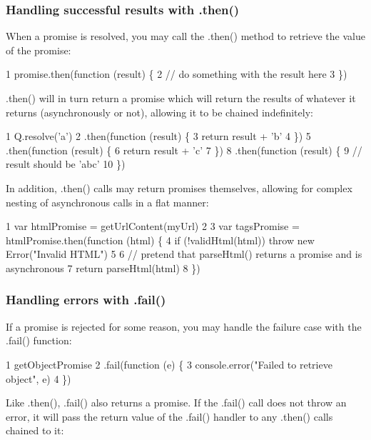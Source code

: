 \subsubsection*{Handling successful results with {\ttfamily .then()}}

When a promise is resolved, you may call the {\ttfamily .then()} method to retrieve the value of the promise\+:


\begin{DoxyCode}
1 promise.then(function (result) \{
2   // do something with the result here
3 \})
\end{DoxyCode}


{\ttfamily .then()} will in turn return a promise which will return the results of whatever it returns (asynchronously or not), allowing it to be chained indefinitely\+:


\begin{DoxyCode}
1 Q.resolve('a')
2   .then(function (result) \{
3     return result + 'b'
4   \})
5   .then(function (result) \{
6     return result + 'c'
7   \})
8   .then(function (result) \{
9     // result should be 'abc'
10   \})
\end{DoxyCode}


In addition, {\ttfamily .then()} calls may return promises themselves, allowing for complex nesting of asynchronous calls in a flat manner\+:


\begin{DoxyCode}
1 var htmlPromise = getUrlContent(myUrl)
2 
3 var tagsPromise = htmlPromise.then(function (html) \{
4   if (!validHtml(html)) throw new Error("Invalid HTML")
5 
6   // pretend that parseHtml() returns a promise and is asynchronous
7   return parseHtml(html)
8 \})
\end{DoxyCode}


\subsubsection*{Handling errors with {\ttfamily .fail()}}

If a promise is rejected for some reason, you may handle the failure case with the {\ttfamily .fail()} function\+:


\begin{DoxyCode}
1 getObjectPromise
2   .fail(function (e) \{
3     console.error("Failed to retrieve object", e)
4   \})
\end{DoxyCode}


Like {\ttfamily .then()}, {\ttfamily .fail()} also returns a promise. If the {\ttfamily .fail()} call does not throw an error, it will pass the return value of the {\ttfamily .fail()} handler to any {\ttfamily .then()} calls chained to it\+:


